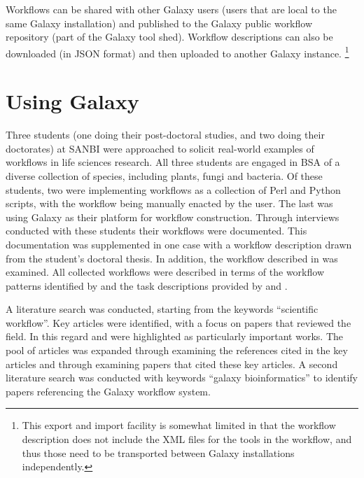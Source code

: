 \documentclass[a4paper,10pt]{scrreprt} \usepackage[utf8]{inputenc}
\begin{document}
Workflows can be shared with other Galaxy users (users that are local to the same Galaxy installation) and published to the Galaxy public workflow repository (part of the Galaxy tool shed). Workflow descriptions can also be downloaded (in JSON format) and then uploaded to another Galaxy instance. \footnote{This export and import facility is somewhat limited in that the workflow description does not include the XML files for the tools in the workflow, and thus those need to be transported between Galaxy installations independently.}



\section{Using Galaxy}
Three students (one doing their post-doctoral studies, and two doing their doctorates) at SANBI were approached to solicit real-world examples of workflows in life sciences research. All three students are engaged in \gls{BSA} of a diverse collection of species, including plants, fungi and bacteria. Of these students, two were implementing workflows as a collection of Perl and Python scripts, with the workflow being manually enacted by the user. The last was using Galaxy as their platform for workflow construction. Through interviews conducted with these students their workflows were documented. This documentation was supplemented in one case with a workflow description drawn from the student's doctoral thesis. In addition, the workflow described in \cite{blankenberg_framework_2007} was examined. All collected workflows were described in terms of the workflow patterns identified by \cite{van_der_aalst_workflow_2003} and the task descriptions provided by \cite{stevens_classification_2001}
and \cite{castro_workflows_2005}.

A literature search was conducted, starting from the keywords ``scientific workflow''. Key articles were identified, with a focus on papers that reviewed the field. In this regard \cite{yu_taxonomy_2005} and \cite{deelman_workflows_2009} were highlighted as particularly important works. The pool of articles was expanded through examining the references cited in the key articles and through examining papers that cited these key articles. A second literature search was conducted with keywords ``galaxy bioinformatics'' to identify papers referencing the Galaxy workflow system.
\end{document}
